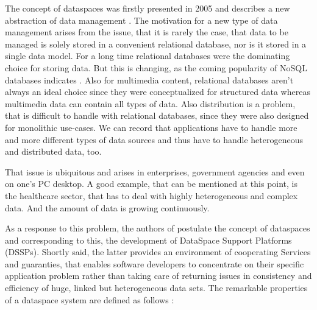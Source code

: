 The concept of dataspaces was firstly presented in 2005 and describes a new abstraction of data management \cite[p. 27]{Franklin:2005:DDN:1107499.1107502}. 
The motivation for a new type of data management arises from the issue, that it is rarely the case, that data to be managed is solely stored in a convenient relational database, nor is it stored in a single data model.
For a long time relational databases were the dominating choice for storing data. But this is changing, as the coming popularity of NoSQL databases indicates \cite{SQL_NOSQL_DATABASES}. Also for multimedia content, relational databases aren't always an ideal choice since they were conceptualized for structured data whereas multimedia data can contain all types of data. Also distribution is a problem, that is difficult to handle with relational databases, since they were also designed for monolithic use-cases.
We can record that applications have to handle more and more different types of data sources and thus have to handle heterogeneous and distributed data, too.

That issue is ubiquitous and arises in enterprises, government agencies and even on one's PC desktop. A good example, that can be mentioned at this point, is the healthcare sector, that has to deal with highly heterogeneous and complex data. And the amount of data is growing continuously. 

As a response to this problem, the authors of \cite{Franklin:2005:DDN:1107499.1107502} postulate the concept of dataspaces and corresponding to this, the  development of DataSpace Support Platforms (DSSPs). Shortly said, the latter provides an environment of cooperating Services and guaranties, that enables software developers to concentrate on their specific application problem rather than taking care of returning issues in consistency and efficiency of huge, linked but heterogeneous data sets. The remarkable properties of a dataspace system are defined as follows \cite[p. 28]{Franklin:2005:DDN:1107499.1107502}:

